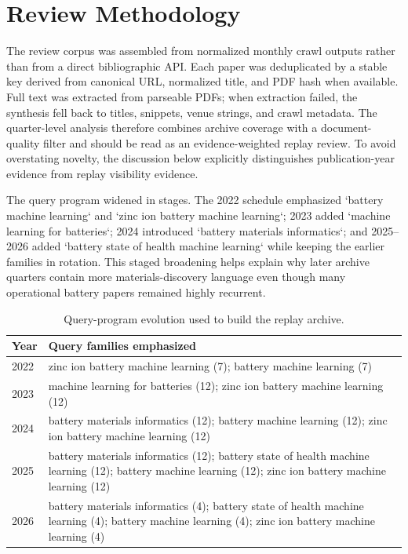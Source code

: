 \documentclass[journal]{IEEEtran}
\begin{document}
\section{Review Methodology}
The review corpus was assembled from normalized monthly crawl outputs rather than from a direct bibliographic API. Each paper was deduplicated by a stable key derived from canonical URL, normalized title, and PDF hash when available. Full text was extracted from parseable PDFs; when extraction failed, the synthesis fell back to titles, snippets, venue strings, and crawl metadata. The quarter-level analysis therefore combines archive coverage with a document-quality filter and should be read as an evidence-weighted replay review. To avoid overstating novelty, the discussion below explicitly distinguishes publication-year evidence from replay visibility evidence.

The query program widened in stages. The 2022 schedule emphasized `battery machine learning` and `zinc ion battery machine learning`; 2023 added `machine learning for batteries`; 2024 introduced `battery materials informatics`; and 2025--2026 added `battery state of health machine learning` while keeping the earlier families in rotation. This staged broadening helps explain why later archive quarters contain more materials-discovery language even though many operational battery papers remained highly recurrent.

\begin{table}[t]
\caption{Query-program evolution used to build the replay archive.}
\label{tab:query_program}
\centering
\footnotesize
\begin{tabularx}{\linewidth}{lX}
\toprule
Year & Query families emphasized \\
\midrule
2022 & zinc ion battery machine learning (7); battery machine learning (7) \\
2023 & machine learning for batteries (12); zinc ion battery machine learning (12) \\
2024 & battery materials informatics (12); battery machine learning (12); zinc ion battery machine learning (12) \\
2025 & battery materials informatics (12); battery state of health machine learning (12); battery machine learning (12); zinc ion battery machine learning (12) \\
2026 & battery materials informatics (4); battery state of health machine learning (4); battery machine learning (4); zinc ion battery machine learning (4) \\
\bottomrule
\end{tabularx}
\end{table}
\end{document}
